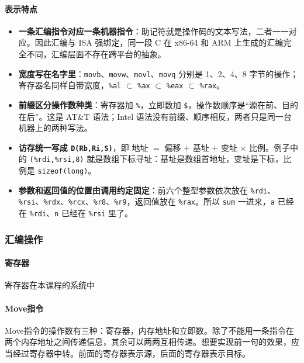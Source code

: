 \paragraph{表示特点}
\begin{itemize}
    \item \textbf{一条汇编指令对应一条机器指令}：助记符就是操作码的文本写法，二者一一对应。因此汇编与 ISA 强绑定，同一段 C 在 x86-64 和 ARM 上生成的汇编完全不同，汇编层面不存在跨平台的抽象。
    \item \textbf{宽度写在名字里}：\texttt{movb}、\texttt{movw}、\texttt{movl}、\texttt{movq} 分别是 1、2、4、8 字节的操作；寄存器名同样自带宽度，\texttt{\%al} $\subset$ \texttt{\%ax} $\subset$ \texttt{\%eax} $\subset$ \texttt{\%rax}。
    \item \textbf{前缀区分操作数种类}：寄存器加 \texttt{\%}，立即数加 \texttt{\$}，操作数顺序是“源在前、目的在后”。这是 AT\&T 语法；Intel 语法没有前缀、顺序相反，两者只是同一台机器上的两种写法。
    \item \textbf{访存统一写成 \texttt{D(Rb,Ri,S)}}，即 地址 $=$ 偏移 $+$ 基址 $+$ 变址 $\times$ 比例。例子中的 \texttt{(\%rdi,\%rsi,8)} 就是数组下标寻址：基址是数组首地址，变址是下标，比例是 \texttt{sizeof(long)}。
    \item \textbf{参数和返回值的位置由调用约定固定}：前六个整型参数依次放在 \texttt{\%rdi}、\texttt{\%rsi}、\texttt{\%rdx}、\texttt{\%rcx}、\texttt{\%r8}、\texttt{\%r9}，返回值放在 \texttt{\%rax}。所以 \texttt{sum} 一进来，\texttt{a} 已经在 \texttt{\%rdi}、\texttt{n} 已经在 \texttt{\%rsi} 里了。
\end{itemize}

\subsubsection{汇编操作}

\paragraph{寄存器}

寄存器在本课程的系统中

\paragraph{Move指令}

Move指令的操作数有三种：寄存器，内存地址和立即数。除了不能用一条指令在两个内存地址之间传递信息，其余可以两两互相传递。想要实现前一句的效果，应当经过寄存器中转。前面的寄存器表示源，后面的寄存器表示目标。


